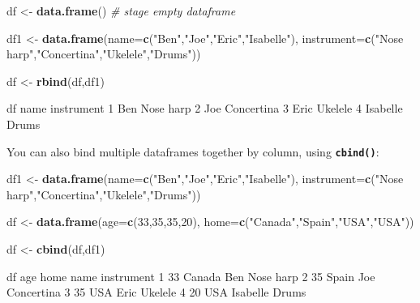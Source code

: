 \documentclass[
]{book}
\newenvironment{Shaded}{\begin{snugshade}}{\end{snugshade}}
\newcommand{\AttributeTok}[1]{\textcolor[rgb]{0.13,0.29,0.53}{#1}}
\newcommand{\CommentTok}[1]{\textcolor[rgb]{0.56,0.35,0.01}{\textit{#1}}}
\newcommand{\DecValTok}[1]{\textcolor[rgb]{0.00,0.00,0.81}{#1}}
\newcommand{\FunctionTok}[1]{\textcolor[rgb]{0.13,0.29,0.53}{\textbf{#1}}}
\newcommand{\NormalTok}[1]{#1}
\newcommand{\OtherTok}[1]{\textcolor[rgb]{0.56,0.35,0.01}{#1}}
\newcommand{\StringTok}[1]{\textcolor[rgb]{0.31,0.60,0.02}{#1}}
\begin{document}
\begin{Shaded}
\begin{Highlighting}[]
\NormalTok{df }\OtherTok{\textless{}{-}} \FunctionTok{data.frame}\NormalTok{() }\CommentTok{\# stage empty dataframe}

\NormalTok{df1 }\OtherTok{\textless{}{-}} \FunctionTok{data.frame}\NormalTok{(}\AttributeTok{name=}\FunctionTok{c}\NormalTok{(}\StringTok{"Ben"}\NormalTok{,}\StringTok{"Joe"}\NormalTok{,}\StringTok{"Eric"}\NormalTok{,}\StringTok{"Isabelle"}\NormalTok{),}
                  \AttributeTok{instrument=}\FunctionTok{c}\NormalTok{(}\StringTok{"Nose harp"}\NormalTok{,}\StringTok{"Concertina"}\NormalTok{,}\StringTok{"Ukelele"}\NormalTok{,}\StringTok{"Drums"}\NormalTok{))}

\NormalTok{df }\OtherTok{\textless{}{-}} \FunctionTok{rbind}\NormalTok{(df,df1)}

\NormalTok{df}
\NormalTok{      name instrument}
\DecValTok{1}\NormalTok{      Ben  Nose harp}
\DecValTok{2}\NormalTok{      Joe Concertina}
\DecValTok{3}\NormalTok{     Eric    Ukelele}
\DecValTok{4}\NormalTok{ Isabelle      Drums}
\end{Highlighting}
\end{Shaded}

You can also bind multiple dataframes together by column, using \textbf{\texttt{cbind()}}:

\begin{Shaded}
\begin{Highlighting}[]
\NormalTok{df1 }\OtherTok{\textless{}{-}} \FunctionTok{data.frame}\NormalTok{(}\AttributeTok{name=}\FunctionTok{c}\NormalTok{(}\StringTok{"Ben"}\NormalTok{,}\StringTok{"Joe"}\NormalTok{,}\StringTok{"Eric"}\NormalTok{,}\StringTok{"Isabelle"}\NormalTok{),}
                  \AttributeTok{instrument=}\FunctionTok{c}\NormalTok{(}\StringTok{"Nose harp"}\NormalTok{,}\StringTok{"Concertina"}\NormalTok{,}\StringTok{"Ukelele"}\NormalTok{,}\StringTok{"Drums"}\NormalTok{))}

\NormalTok{df }\OtherTok{\textless{}{-}} \FunctionTok{data.frame}\NormalTok{(}\AttributeTok{age=}\FunctionTok{c}\NormalTok{(}\DecValTok{33}\NormalTok{,}\DecValTok{35}\NormalTok{,}\DecValTok{35}\NormalTok{,}\DecValTok{20}\NormalTok{), }\AttributeTok{home=}\FunctionTok{c}\NormalTok{(}\StringTok{"Canada"}\NormalTok{,}\StringTok{"Spain"}\NormalTok{,}\StringTok{"USA"}\NormalTok{,}\StringTok{"USA"}\NormalTok{))}

\NormalTok{df }\OtherTok{\textless{}{-}} \FunctionTok{cbind}\NormalTok{(df,df1)}

\NormalTok{df}
\NormalTok{  age   home     name instrument}
\DecValTok{1}  \DecValTok{33}\NormalTok{ Canada      Ben  Nose harp}
\DecValTok{2}  \DecValTok{35}\NormalTok{  Spain      Joe Concertina}
\DecValTok{3}  \DecValTok{35}\NormalTok{    USA     Eric    Ukelele}
\DecValTok{4}  \DecValTok{20}\NormalTok{    USA Isabelle      Drums}
\end{Highlighting}
\end{Shaded}
\end{document}
